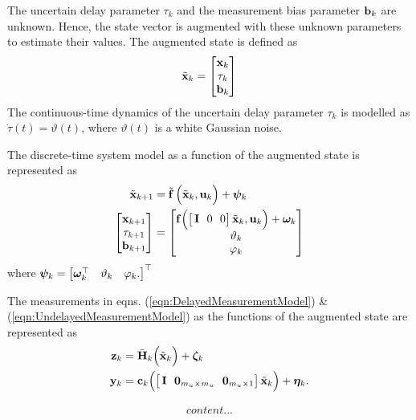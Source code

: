 The uncertain delay parameter $\tau_k$ and the measurement bias parameter $\mathbf{b}_k$ are unknown. Hence, the state vector is augmented with these unknown parameters to estimate their values. The augmented state is defined as
\begin{align}
	\tilde{\mathbf{x}}_k =
	\begin{bmatrix}
		\mathbf{x}_k \\ \tau_k \\ \mathbf{b}_k
	\end{bmatrix} 
\end{align}
The continuous-time dynamics of the uncertain delay parameter $\tau_k$ is modelled as $\dot{\tau}(t) = \vartheta(t)$, where $\vartheta(t)$ is a white Gaussian noise. 

The discrete-time system model as a function of the augmented state is represented as
\begin{align}
	\tilde{\mathbf{x}}_{k+1} &= 
	\tilde{\mathbf{f}} \, \Big( \tilde{\mathbf{x}}_k, \mathbf{u}_k \Big) + \boldsymbol{\psi}_k\\
	\begin{bmatrix}
		\mathbf{x}_{k+1} \\ \tau_{k+1} \\ \mathbf{b}_{k+1}
	\end{bmatrix} &= 
	\begin{bmatrix}
		\mathbf{f} \Big( \big[\, \mathbf{I} \ \ 0 \ \ 0 \big] \,\tilde{\mathbf{x}}_k, \mathbf{u}_k \Big) + \boldsymbol{\omega}_k \\ \vartheta_k \\ \varphi_k
	\end{bmatrix} \nonumber
\end{align}
where $\boldsymbol{\psi}_k = \begin{bmatrix} \boldsymbol{\omega}_k^\top & \vartheta_k & \varphi_k. \end{bmatrix}^\top$

The measurements in eqns. (\ref{eqn:DelayedMeasurementModel}) \& (\ref{eqn:UndelayedMeasurementModel}) as the functions of the augmented state are represented as
\begin{align} 
	\label{eqn:DelayedMeasurementModelAug}
	\mathbf{z}_k &= \tilde{\mathbf{H}}_k \Big( \tilde{\mathbf{x}}_k \Big) + \boldsymbol{\zeta}_k \\
	\label{eqn:UndelayedMeasurementModelAug}
	\mathbf{y}_k &= \mathbf{c}_k \Big( \big[\, \mathbf{I} \ \ \boldsymbol{0}_{m_u \times m_u} \ \ \boldsymbol{0}_{m_u \times 1} \big] \,\tilde{\mathbf{x}}_k \Big) + \boldsymbol{\eta}_k.
\end{align}

\begin{align}
	content...
\end{align}

